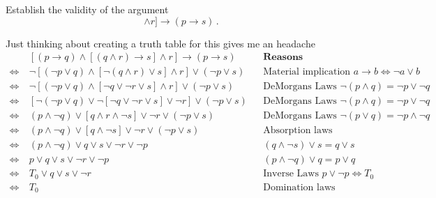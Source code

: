 \documentclass[a4paper, english, 12pt]{article} %
\begin{document}
\begin{problem}[10]
  Establish the validity of the argument
  \begin{equation*}
    [(p \to q) \wedge [(q \wedge r) \to s] \wedge r] \to (p \to s)\,.
  \end{equation*}
\end{problem}

\begin{answer}
  Just thinking about creating a truth table for this gives me an headache
  \begin{align*}
    \ & [(p \to q) \wedge [(q \wedge r) \to s] \wedge r] \to (p \to s)
     && \textbf{Reasons}\\ 
    \Leftrightarrow \ & \neg [(\neg p \vee q) \wedge [\neg (q \wedge r) \vee s] \wedge r] \vee (\neg p \vee s)
     && \text{Material implication $a \to b \Leftrightarrow \neg a \vee b$} \\
    \Leftrightarrow \ & \neg [(\neg p \vee q) \wedge [\neg q \vee \neg r \vee s] \wedge r] \vee (\neg p \vee s)
     && \text{DeMorgans Laws $\neg (p \wedge q) = \neg p \vee \neg q$} \\
    \Leftrightarrow \ & [\neg (\neg p \vee q) \vee \neg [\neg q \vee \neg r \vee s] \vee \neg r] \vee (\neg p \vee s)
     && \text{DeMorgans Laws $\neg (p \wedge q) = \neg p \vee \neg q$} \\
    \Leftrightarrow \ & (p \wedge \neg q) \vee [q \wedge r \wedge \neg s] \vee \neg r \vee (\neg p \vee s)
     && \text{DeMorgans Laws $\neg (p \vee q) = \neg p \wedge \neg q$} \\
    \Leftrightarrow \ & (p \wedge \neg q) \vee [q \wedge \neg s] \vee \neg r \vee (\neg p \vee s)
     && \text{Absorption laws} \\
    \Leftrightarrow \ & (p \wedge \neg q) \vee q \vee s \vee \neg r \vee \neg p
     && \text{$(q \wedge \neg s) \vee s = q \vee s$} \\
    \Leftrightarrow \ & p \vee q \vee s \vee \neg r \vee \neg p
     && \text{$(p \wedge \neg q) \vee q = p \vee q$} \\
    \Leftrightarrow \ & T_0 \vee q \vee s \vee \neg r 
     && \text{Inverse Laws $p \vee \neg p \Leftrightarrow T_0$} \\
    \Leftrightarrow \ & T_0
     && \text{Domination laws} \\
  \end{align*} 
\end{answer}

  

\end{document}
